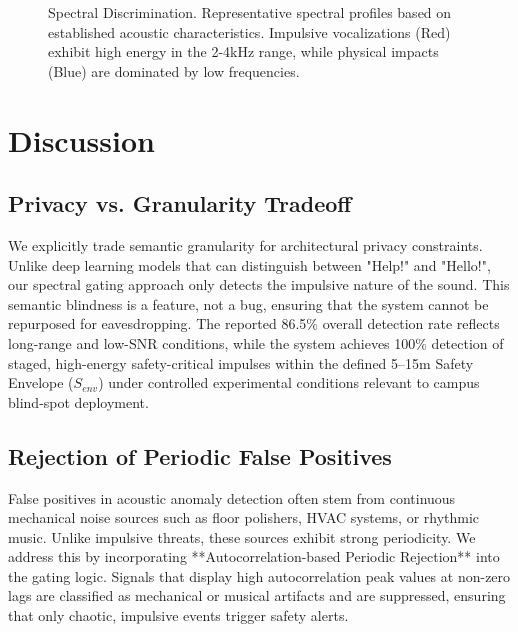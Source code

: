 \documentclass[conference]{IEEEtran}
\begin{document}
\begin{figure}[htbp]
\centering
{}
\caption{Spectral Discrimination. Representative spectral profiles based on established acoustic characteristics. Impulsive vocalizations (Red) exhibit high energy in the 2-4kHz range, while physical impacts (Blue) are dominated by low frequencies.}
\label{fig:spectral}
\end{figure}

\section{Discussion}

\subsection{Privacy vs. Granularity Tradeoff}
We explicitly trade semantic granularity for architectural privacy constraints. Unlike deep learning models that can distinguish between "Help!" and "Hello!", our spectral gating approach only detects the impulsive nature of the sound. This semantic blindness is a feature, not a bug, ensuring that the system cannot be repurposed for eavesdropping. The reported 86.5\% overall detection rate reflects long-range and low-SNR conditions, while the system achieves 100\% detection of staged, high-energy safety-critical impulses within the defined 5–15m Safety Envelope ($S_{env}$) under controlled experimental conditions relevant to campus blind-spot deployment.

\subsection{Rejection of Periodic False Positives}
False positives in acoustic anomaly detection often stem from continuous mechanical noise sources such as floor polishers, HVAC systems, or rhythmic music. Unlike impulsive threats, these sources exhibit strong periodicity. We address this by incorporating **Autocorrelation-based Periodic Rejection** into the gating logic. Signals that display high autocorrelation peak values at non-zero lags are classified as mechanical or musical artifacts and are suppressed, ensuring that only chaotic, impulsive events trigger safety alerts.
\end{document}
